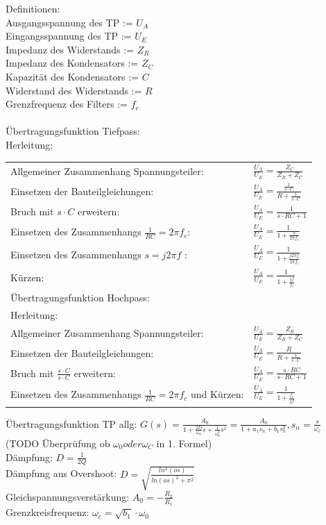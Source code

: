 \documentclass[A4]{scrreprt}
\begin{document}
  \newpage
  Definitionen:\\
  Ausgangsspannung des TP := $U_A$\\
  Eingangsspannung des TP := $U_E$\\
  Impedanz des Widerstands := $Z_R$\\
  Impedanz des Kondensators := $Z_C$\\
  Kapazität des Kondensators := $C$\\
  Widerstand des Widerstands := $R$\\
  Grenzfrequenz des Filters := $f_c$\\
  \\
  Übertragungsfunktion Tiefpass:\\
  Herleitung:\\ 
  \begin{tabular}{l|l}
    Allgemeiner Zusammenhang Spannungsteiler:& $\frac{U_A}{U_E} = \frac{Z_C}{Z_R+Z_C}$\\
    Einsetzen der Bauteilgleichungen:& $\frac{U_A}{U_E} = \frac{\frac{1}{s\cdot C}}{R + \frac{1}{s \cdot C}}$\\
    Bruch mit $s\cdot C$ erweitern:& $\frac{U_A}{U_E} = \frac{1}{s \cdot RC + 1}$\\
    Einsetzen des Zusammenhangs $\frac{1}{RC} = 2\pi f_c$:& $\frac{U_A}{U_E} = \frac{1}{1 + \frac{s}{2\pi f_c}}$\\
    Einsetzen des Zusammenhangs $s = j2\pi f$ :& $\frac{U_A}{U_E} = \frac{1}{1 + \frac{j2\pi f}{2\pi f_c}}$\\
    Kürzen:& $\frac{U_A}{U_E} = \frac{1}{1 + \frac{jf}{f_c}}$\\
    Übertragungsfunktion Hochpass:\\
    Herleitung:\\ 
    Allgemeiner Zusammenhang Spannungsteiler:& $\frac{U_A}{U_E} = \frac{Z_R}{Z_R+Z_C}$\\
    Einsetzen der Bauteilgleichungen:& $\frac{U_A}{U_E} = \frac{R}{R+\frac{1}{s \cdot C}}$\\
    Bruch mit $\frac{s\cdot C}{s\cdot C}$ erweitern:& $\frac{U_A}{U_E} = \frac{s \cdot RC}{s \cdot RC+1}$\\
    Einsetzen des Zusammenhangs $\frac{1}{RC} = 2\pi f_c$ und Kürzen:& $\frac{U_A}{U_E} = \frac{1}{1+\frac{f_c}{jf}}$\\
  \end{tabular}

  Übertragungsfunktion TP allg: $G(s) = \frac{A_0}{1+\frac{2D}{\omega_0}s+\frac{1}{\omega_0^2}s^2} = \frac{A_0}{1+a_1 s_n + b_1 s_n^2},s_n = \frac{s}{\omega_c}$ (TODO Überprüfung ob $\omega_0 oder \omega_C$ in 1. Formel)\\
  Dämpfung: $D = \frac{1}{2Q}$\\
  Dämpfung aus Overshoot: $D = \sqrt{\frac{ln^2(os)}{ln(os)^2+\pi^2}}$\\
  Gleichspannungsverstärkung: $A_0 = - \frac{R_2}{R_1}$\\
  Grenzkreisfrequenz: $\omega_c = \sqrt{b_1}\cdot \omega_0$\\
  
\end{document}
